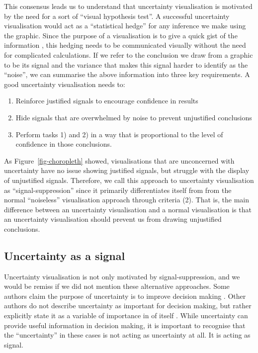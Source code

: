 \documentclass[
  12pt]{article}
\providecommand{\tightlist}{%
  \setlength{\itemsep}{0pt}\setlength{\parskip}{0pt}}
\begin{document}
This consensus leads us to understand that uncertainty visualisation is
motivated by the need for a sort of ``visual hypothesis test''. A
successful uncertainty visualisation would act as a ``statistical
hedge'' for any inference we make using the graphic. Since the purpose
of a visualisation is to give a quick gist of the information
\citep{Spiegelhalter2017}, this hedging needs to be communicated
visually without the need for complicated calculations. If we refer to
the conclusion we draw from a graphic to be its signal and the variance
that makes this signal harder to identify as the ``noise'', we can
summarise the above information into three key requirements. A good
uncertainty visualisation needs to:

\begin{enumerate}
\def\labelenumi{\arabic{enumi})}
\tightlist
\item
  Reinforce justified signals to encourage confidence in results
\item
  Hide signals that are overwhelmed by noise to prevent unjustified
  conclusions
\item
  Perform tasks 1) and 2) in a way that is proportional to the level of
  confidence in those conclusions.
\end{enumerate}

As Figure~\ref{fig-choropleth} showed, visualisations that are
unconcerned with uncertainty have no issue showing justified signals,
but struggle with the display of unjustified signals. Therefore, we call
this approach to uncertainty visualisation as ``signal-suppression''
since it primarily differentiates itself from from the normal
``noiseless'' visualisation approach through criteria (2). That is, the
main difference between an uncertainty visualisation and a normal
visualisation is that an uncertainty visualisation should prevent us
from drawing unjustified conclusions.

\subsection{Uncertainty as a signal}\label{uncertainty-as-a-signal}

Uncertainty visualisation is not only motivated by signal-suppression,
and we would be remiss if we did not mention these alternative
approaches. Some authors claim the purpose of uncertainty is to improve
decision making
\citep{Ibrekk1987, uncertchap2022, Hullman2016, Cheong2016, Boone2018, Padilla2017}.
Other authors do not describe uncertainty as important for decision
making, but rather explicitly state it as a variable of importance in of
itself \citep{Blenkinsop2000}. While uncertainty can provide useful
information in decision making, it is important to recognise that the
``uncertainty'' in these cases is not acting as uncertainty at all. It
is acting as signal.
\end{document}
